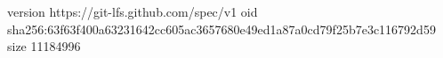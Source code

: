 version https://git-lfs.github.com/spec/v1
oid sha256:63f63f400a63231642cc605ac3657680e49ed1a87a0cd79f25b7e3c116792d59
size 11184996
